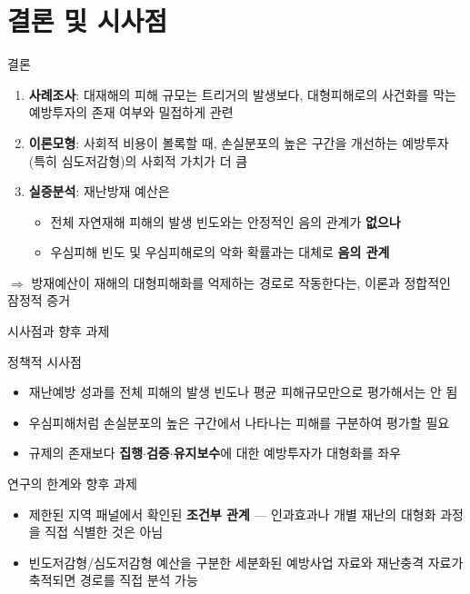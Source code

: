 \documentclass[aspectratio=169,10pt]{beamer}
\begin{document}
\section{결론 및 시사점}

\begin{frame}{결론}
  \begin{enumerate}
    \item \textbf{사례조사}: 대재해의 피해 규모는 트리거의 발생보다, 대형피해로의 사건화를 막는 \alert{예방투자의 존재 여부}와 밀접하게 관련
    \vspace{4pt}
    \item \textbf{이론모형}: 사회적 비용이 볼록할 때, 손실분포의 \alert{높은 구간}을 개선하는 예방투자(특히 심도저감형)의 사회적 가치가 더 큼
    \vspace{4pt}
    \item \textbf{실증분석}: 재난방재 예산은
    \begin{itemize}\small
      \item 전체 자연재해 피해의 발생 빈도와는 안정적인 음의 관계가 \textbf{없으나}
      \item 우심피해 빈도 및 우심피해로의 악화 확률과는 대체로 \textbf{음의 관계}
    \end{itemize}
  \end{enumerate}
  \vspace{6pt}
  \begin{center}
    $\Rightarrow$ 방재예산이 재해의 \alert{대형피해화를 억제}하는 경로로 작동한다는, 이론과 정합적인 잠정적 증거
  \end{center}
\end{frame}

\begin{frame}{시사점과 향후 과제}
  \begin{block}{정책적 시사점}
    \small
    \begin{itemize}
      \item 재난예방 성과를 전체 피해의 발생 빈도나 평균 피해규모만으로 평가해서는 안 됨
      \item 우심피해처럼 \alert{손실분포의 높은 구간}에서 나타나는 피해를 구분하여 평가할 필요
      \item 규제의 존재보다 \textbf{집행$\cdot$검증$\cdot$유지보수}에 대한 예방투자가 대형화를 좌우
    \end{itemize}
  \end{block}
  \begin{block}{연구의 한계와 향후 과제}
    \small
    \begin{itemize}
      \item 제한된 지역 패널에서 확인된 \textbf{조건부 관계} --- 인과효과나 개별 재난의 대형화 과정을 직접 식별한 것은 아님
      \item 빈도저감형/심도저감형 예산을 구분한 세분화된 예방사업 자료와 재난충격 자료가 축적되면 경로를 직접 분석 가능
    \end{itemize}
  \end{block}
\end{frame}
\end{document}
